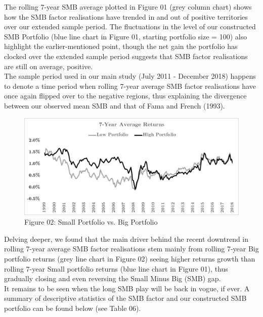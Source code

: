 \documentclass[12pt]{article}
\begin{document}
\newpage

\noindent The rolling 7-year SMB average plotted in Figure 01 (grey column chart) shows how the SMB factor realisations have trended in and out of positive territories over our extended sample period. The fluctuations in the level of our constructed SMB Portfolio (blue line chart in Figure 01, starting portfolio size = 100) also highlight the earlier-mentioned point, though the net gain the portfolio has clocked over the extended sample period suggests that SMB factor realisations are still on average, positive. \\

\noindent The sample period used in our main study (July 2011 - December 2018) happens to denote a time period when rolling 7-year average SMB factor realisations have once again flipped over to the negative regions, thus explaining the divergence between our observed mean SMB and that of Fama and French (1993).

\begin{figure}[h]
	\centering
	\includegraphics[width=0.83\linewidth,trim=4 4 4 4,clip]{SMB02}
	\caption*{Figure 02: Small Portfolio vs. Big Portfolio}
	\label{fig:label}
\end{figure}

\noindent Delving deeper, we found that the main driver behind the recent downtrend in rolling 7-year average SMB factor realisations stem mainly from rolling 7-year Big portfolio returns (grey line chart in Figure 02) seeing higher returns growth than rolling 7-year Small portfolio returns (blue line chart in Figure 01), thus gradually closing and even reversing the Small Minus Big (SMB) gap.\\

\noindent It remains to be seen when the long SMB play will be back in vogue, if ever. A summary of descriptive statistics of the SMB factor and our constructed SMB portfolio can be found below (see Table 06).

\newpage
\end{document}
